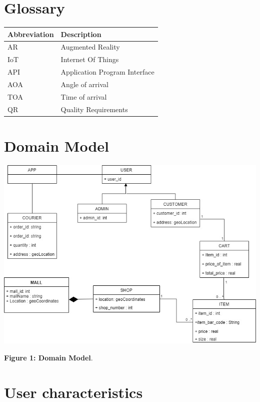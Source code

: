 \documentclass{article}
\begin{document}
\section{Glossary}
    \begin{table}[h]
        \centering
        \begin{tabular}{|p{5cm}|p{5cm}|}
         \hline
            \textbf{Abbreviation} & \textbf{Description}  \\
            \hline
            AR    &   Augmented Reality \\ 
            \hline
            IoT     & Internet Of Things \\ 
            \hline 
            API     & Application Program Interface \\             \hline
            AOA     & Angle of arrival \\
            \hline
            TOA     & Time of arrival \\
            \hline
            QR      & Quality Requirements\\
            \hline
        \end{tabular}
    \end{table}
\section{Domain Model}
\includegraphics[scale=0.6]{Mall_Navigation.jpg}
\begin{center}
    \textbf{Figure 1: Domain Model}. 
\end{center}
\section{User characteristics}
\end{document}

